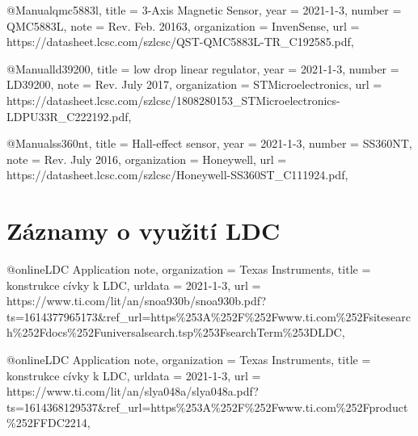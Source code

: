 @Manual{qmc5883l,
    title        = {3-Axis Magnetic Sensor},
    year         = {2021-1-3},
    number       = {QMC5883L},
    note         = {Rev. Feb. 20163},
    organization = {InvenSense},
    url          = {https://datasheet.lcsc.com/szlcsc/QST-QMC5883L-TR\_C192585.pdf},
}

@Manual{ld39200,
    title        = {low drop linear regulator},
    year         = {2021-1-3},
    number       = {LD39200},
    note         = {Rev. July 2017},
    organization = {STMicroelectronics},
    url          = {https://datasheet.lcsc.com/szlcsc/1808280153\_STMicroelectronics-\-LD\-PU33R\_C222192.pdf},
}

@Manual{ss360nt,
    title        = {Hall-effect sensor},
    year         = {2021-1-3},
    number       = {SS360NT},
    note         = {Rev. July 2016},
    organization = {Honeywell},
    url          = {https://da\-ta\-sheet\-.lcsc.com/szlcsc/Honeywell-SS360ST\_C111924.pdf},
}

\section{Záznamy o využití LDC}
@online{LDC Application note,
    organization = {Texas Instruments},
    title        = {konstrukce cívky k LDC},
    urldata      = {2021-1-3},
    url          = {https://www.ti.com/lit/an\-/\-snoa\-930b/snoa930b.pdf?ts=1614377965173\&ref\_url=https\%253A\%252F\-\%252F\-www.\-ti.com\-\%252F\-sitesearch\%252Fdocs\%252Funiversalsearch.tsp\%253F\-searchTerm\%253DLDC},
}

@online{LDC Application note,
    organization = {Texas Instruments},
    title        = {konstrukce cívky k LDC},
    urldata      = {2021-1-3},
    url          = {https://www.ti.com/\-lit/\-an/\-slya048a/slya048a.pdf?ts=1614368129537\&ref\_url=https\%253A\-\%252F\-\%252F\-www.ti.com\%252Fproduct\%252FFDC2214},
}

